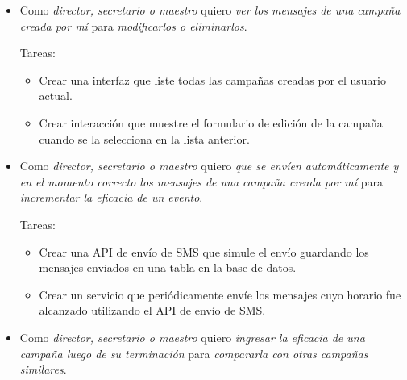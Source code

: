\documentclass[a4paper, 10pt, twoside]{article}
\newenvironment{stories}{
  \begin{itemize}
}{
  \end{itemize}
}
\newcommand{\story}[3]{
  \item
  Como \emph{#1} quiero \emph{#2} para \emph{#3}.
}
\newenvironment{tasks}{
  Tareas:
  \begin{itemize}
}{
  \end{itemize}
}
\newcommand{\task}[1] {
  \item #1.
}
\begin{document}
\begin{stories}
  \story{director, secretario o maestro}
        {ver los mensajes de una campaña creada por mí}
        {modificarlos o eliminarlos}

  \begin{tasks}
    \task{Crear una interfaz que liste todas las campañas creadas por el usuario actual}
    \task{Crear interacción que muestre el formulario de edición de la campaña cuando se la selecciona en la lista anterior}
  \end{tasks}

  \story{director, secretario o maestro}
        {que se envíen automáticamente y en el momento correcto los mensajes de una campaña creada por mí}
        {incrementar la eficacia de un evento}

  \begin{tasks}
    \task{Crear una API de envío de SMS que simule el envío guardando los mensajes enviados en una tabla en la base de datos}
    \task{Crear un servicio que periódicamente envíe los mensajes cuyo horario fue alcanzado utilizando el API de envío de SMS}
  \end{tasks}


  \story{director, secretario o maestro}
        {ingresar la eficacia de una campaña luego de su terminación}
        {compararla con otras campañas similares}
\end{stories}
\end{document}
